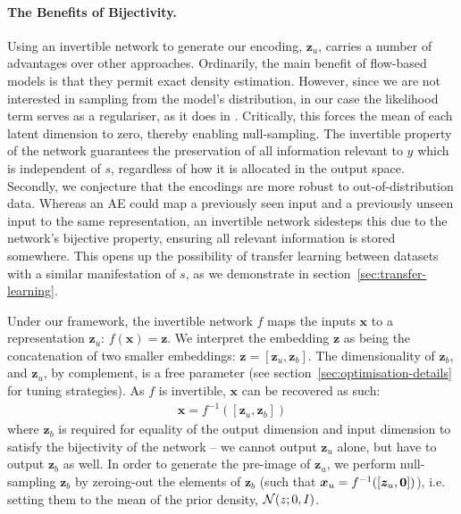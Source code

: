 \paragraph{The Benefits of Bijectivity.}
Using an invertible network to generate our encoding, $\bm{z}_u$, carries a number of advantages
over other approaches. Ordinarily, the main benefit of flow-based models is that they permit exact
density estimation.
%
However, since we are not interested in sampling from the model's distribution, in our case the
likelihood term serves as a regulariser, as it does in \citet{JacSmeOya18}.
%
Critically, this forces the mean of each latent dimension to zero, thereby enabling null-sampling.
%
The invertible property of the network guarantees the preservation of all information relevant to
$y$ which is independent of $s$, regardless of how it is allocated in the output space. 
%
Secondly, we conjecture that the encodings are more robust to out-of-distribution data. 
%
Whereas an \acf{AE} could map a previously seen input and a previously unseen input to the same
representation, an invertible network sidesteps this due to the network's bijective property,
ensuring all relevant information is stored somewhere. 
%
This opens up the possibility of transfer learning between datasets with a similar manifestation of
$s$, as we demonstrate in section~\ref{sec:transfer-learning}.

Under our framework, the invertible network $f$ maps the inputs $\bm{x}$ to a representation
$\bm{z}_u$: $f(\bm{x}) = \bm{z}$. 
%
We interpret the embedding $\bm{z}$ as being the concatenation of two smaller embeddings: $\bm{z} =
[\bm{z}_u, \bm{z}_b]$. 
%
The dimensionality of $\bm{z}_b$, and $\bm{z}_u$, by complement, is a free parameter (see
section~\ref{sec:optimisation-details} for tuning strategies). 
%
As $f$ is invertible, $\bm{x}$ can be recovered as such:
%
\begin{align}
  \bm{x} = f^{-1}([\bm{z}_u, \bm{z}_b])
  \label{eq:zreconstruct}
\end{align}
%
where $\bm{z}_b$ is required for equality of the output dimension and input dimension to satisfy
the bijectivity of the network -- we cannot output $\bm{z}_u$ alone, but have to output $\bm{z}_b$
as well. 
%
In order to generate the pre-image of $\bm{z}_u$, we perform null-sampling \wrt{} $\bm{z}_b$ by
zeroing-out the elements of $\bm{z}_b$ (such that $\bm{x}_{u} = f^{-1}([\bm{z}_{u}, {\bm{0}}])$),
i.e. setting them to the mean of the prior density, ${\mathcal{N}}(z;0, I)$.

